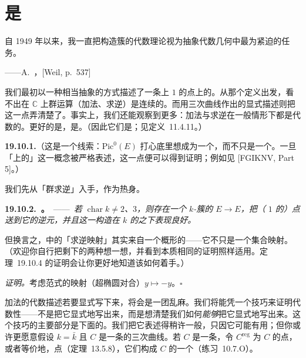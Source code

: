 
\section{\trEllipticCurve{}是\trGroupVariety}

\epigraph{自 1949 年以来，我一直把构造\trPicard{}簇的代数理论视为抽象代数几何中最为紧迫的任务。}{——A.~\trWeil，[Weil, p.~537]}

我们最初以一种相当抽象的方式描述了一条\trAlgebraic\trCurve{}上\trDegree{} $1$ 的点上的\trGroupLaw。从那个定义出发，看不出在 $\mathbb{C}$ 上群运算（加法、求逆）是连续的。而用三次曲线作出的显式描述则把这一点弄清楚了。事实上，我们还能观察到更多：加法与求逆在一般情形下都是代数的。更好的是，\trEllipticCurve{}是\trGroupVariety。（因此它们是\trAbelianVariety；见\mbox{定义~11.4.11}。）

\textbf{19.10.1.}（这是一个线索：$\mathrm{Pic}^0(E)$ 打心底里想成为一个\trScheme，而不只是一个\trGroup。一旦「\trVariety{}上\trLineBundle{}的\trModuliSpace」这一概念被严格表述，这一点便可以得到证明；例如见 [FGIKNV, Part 5]。）

我们先从「群求逆」\trMorphism{}入手，作为热身。

\textbf{19.10.2.\ \trhProposition。}\ ——\ \emph{若 $\operatorname{char}k\ne 2$、$3$，则存在一个 $k$-簇的\trMorphism{} $E\to E$，把（\trDegree{} $1$ 的）点送到它的逆元，并且这一构造在 $k$ 的\trFieldExtension{}之下表现良好。}

但换言之，\trGroupLaw{}中的「求逆映射」其实来自一个概形的\trMorphism——它不只是一个集合映射。（欢迎你自行把剩下的两种\trCharacteristic{}想一想，并看到本质相同的证明照样适用。\mbox{定理~19.10.4} 的证明会让你更好地知道该如何着手。）

\emph{证明。}\quad 考虑范式的映射（超椭圆对合）$y\mapsto -y$。\hfill$\square$

加法的代数描述若要显式写下来，将会是一团乱麻。我们将能凭一个技巧来证明代数性——不是把它显式地写出来，而是想清楚我们如何\emph{能够}把它显式地写出来。这个技巧的主要部分是下面的\trhProposition。我们把它表述得稍许一般，只因它可能有用；但你或许更愿意假设 $k=\bar{k}$ 且 $C$ 是一条\trRegular{}的三次曲线。若 $C$ 是一条\trCurve，令 $C^{\mathrm{reg}}$ 为 $C$ 的\trRegular{}点，或者等价地，\trNormal{}点（\mbox{定理~13.5.8}），它们构成 $C$ 的一个\trOpenSubset（\mbox{练习~10.7.O}）。

